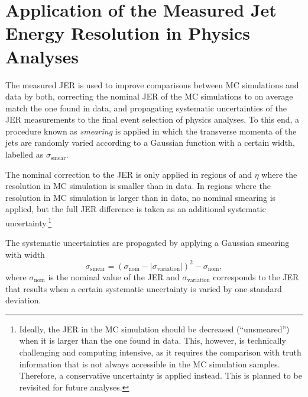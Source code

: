 


\section{Application of the Measured Jet Energy Resolution in Physics Analyses}
\label{sec:jer-in-analysis}
The measured JER is used to improve comparisons between MC simulations and data by both, correcting the nominal JER of the MC simulations to on average match the one found in data, and propagating systematic uncertainties of the JER measurements to the final event selection of physics analyses.
To this end, a procedure known as \emph{smearing} is applied in which the transverse momenta of the jets are randomly varied according to a Gaussian function with a certain width, labelled as $\sigma_{\text{smear}}$.

The nominal correction to the JER is only applied in regions of \pT and $\eta$ where the resolution in MC simulation is smaller than in data. In regions where the resolution in MC simulation is larger than in data, no nominal smearing is applied, but the full JER difference is taken as an additional systematic uncertainty.\footnote{Ideally, the JER in the MC simulation should be decreased (``unsmeared'') when it is larger than the one found in data. This, however, is technically challenging and computing intensive, as it requires the comparison with truth information that is not always accessible in the MC simulation samples. Therefore, a conservative uncertainty is applied instead. This is planned to be revisited for future analyses.}

The systematic uncertainties are propagated by applying a Gaussian smearing with width
\begin{equation}
    \sigma_{\text{smear}} =  \left( \sigma_{\text{nom}} - |\sigma_{\text{variation}}|   \right)^2  - \sigma_{\text{nom}},
\end{equation}
where $\sigma_{\text{nom}}$ is the nominal value of the JER and $\sigma_{\text{variation}}$ corresponds to the JER that results when a certain systematic uncertainty is varied by one standard deviation.

